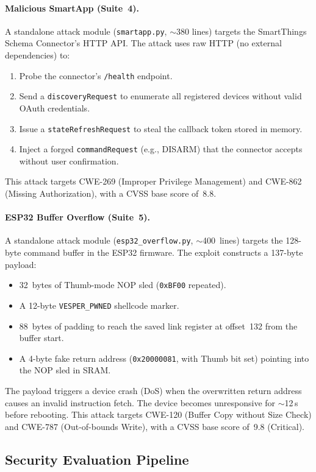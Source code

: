 \paragraph{Malicious SmartApp (Suite~4).}
A standalone attack module (\texttt{smartapp.py}, $\sim$380 lines)
targets the SmartThings Schema Connector's HTTP API.  The attack
uses raw HTTP (no external dependencies) to:
\begin{enumerate}[leftmargin=*]
  \item Probe the connector's \texttt{/health} endpoint.
  \item Send a \texttt{discoveryRequest} to enumerate all registered
    devices without valid OAuth credentials.
  \item Issue a \texttt{stateRefreshRequest} to steal the callback
    token stored in memory.
  \item Inject a forged \texttt{commandRequest} (e.g., DISARM) that
    the connector accepts without user confirmation.
\end{enumerate}
This attack targets CWE-269 (Improper Privilege Management) and
CWE-862 (Missing Authorization), with a CVSS base score of~8.8.

\paragraph{ESP32 Buffer Overflow (Suite~5).}
A standalone attack module (\texttt{esp32\_overflow.py},
$\sim$400~lines) targets the 128-byte command buffer in the ESP32
firmware.  The exploit constructs a 137-byte payload:
\begin{itemize}[leftmargin=*]
  \item 32~bytes of Thumb-mode NOP sled (\texttt{0xBF00} repeated).
  \item A 12-byte \texttt{VESPER\_PWNED} shellcode marker.
  \item 88~bytes of padding to reach the saved link register at
    offset~132 from the buffer start.
  \item A 4-byte fake return address (\texttt{0x20000081}, with
    Thumb bit set) pointing into the NOP sled in SRAM.
\end{itemize}
The payload triggers a device crash (DoS) when the overwritten
return address causes an invalid instruction fetch.  The device
becomes unresponsive for $\sim$12\,s before rebooting.  This attack
targets CWE-120 (Buffer Copy without Size Check) and CWE-787
(Out-of-bounds Write), with a CVSS base score of~9.8 (Critical).

\subsection{Security Evaluation Pipeline}

